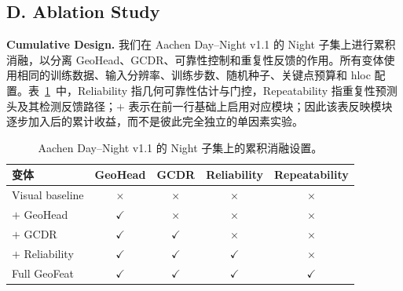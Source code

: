 \documentclass{article}
\begin{document}
\begin{table}[!t]
\centering
\caption{Aachen Day--Night v1.1 上的视觉定位结果。报告 Day 和 Night 子集在三个位姿阈值下的召回率（\%）；对比方法数值引自 LiftFeat~\cite{LiftFeat}。}
\label{tab:localization}
\small
{}
\end{table}

\subsection{D. Ablation Study}
\noindent\textbf{Cumulative Design.} 我们在 Aachen Day--Night v1.1 的 Night 子集上进行累积消融，以分离 GeoHead、GCDR、可靠性控制和重复性反馈的作用。所有变体使用相同的训练数据、输入分辨率、训练步数、随机种子、关键点预算和 hloc 配置。表~\ref{tab:ablation}~中，Reliability 指几何可靠性估计与门控，Repeatability 指重复性预测头及其检测反馈路径；$+$ 表示在前一行基础上启用对应模块；因此该表反映模块逐步加入后的累计收益，而不是彼此完全独立的单因素实验。

\begin{table}[!t]
\centering
\caption{Aachen Day--Night v1.1 的 Night 子集上的累积消融设置。}
\label{tab:ablation}
\small
\begin{tabular}{lcccc}
\toprule
变体 & GeoHead & GCDR & Reliability & Repeatability\\
\midrule
Visual baseline & $\times$ & $\times$ & $\times$ & $\times$\\
$+$ GeoHead & $\checkmark$ & $\times$ & $\times$ & $\times$\\
$+$ GCDR & $\checkmark$ & $\checkmark$ & $\times$ & $\times$\\
$+$ Reliability & $\checkmark$ & $\checkmark$ & $\checkmark$ & $\times$\\
Full GeoFeat & $\checkmark$ & $\checkmark$ & $\checkmark$ & $\checkmark$\\
\bottomrule
\end{tabular}
\end{table}
\end{document}
